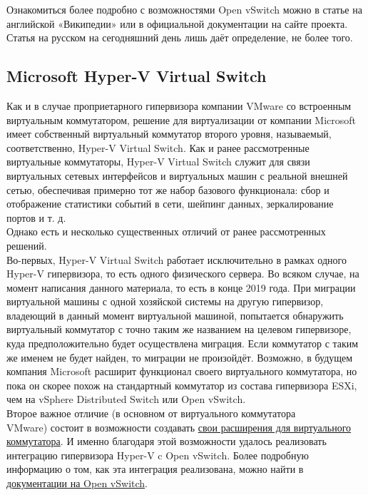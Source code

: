 \documentclass[14pt, a4paper]{article}
\begin{document}
Ознакомиться более подробно с возможностями Open vSwitch можно в статье на английской
«Википедии» или в официальной документации на сайте проекта. Статья на русском на сегодняшний
день лишь даёт определение, не более того.

\subsection*{Microsoft Hyper-V Virtual Switch} 

Как и в случае проприетарного гипервизора компании VMware со встроенным виртуальным
коммутатором, решение для виртуализации от компании Microsoft имеет собственный виртуальный
коммутатор второго уровня, называемый, соответственно, Hyper-V Virtual Switch. Как и ранее
рассмотренные виртуальные коммутаторы, Hyper-V Virtual Switch служит для связи виртуальных
сетевых интерфейсов и виртуальных машин с реальной внешней сетью, обеспечивая примерно тот
же набор базового функционала: сбор и отображение статистики событий в сети, шейпинг данных,
зеркалирование портов и т. д.\\

Однако есть и несколько существенных отличий от ранее рассмотренных решений.\\

Во-первых, Hyper-V Virtual Switch работает исключительно в рамках одного Hyper-V гипервизора, то
есть одного физического сервера. Во всяком случае, на момент написания данного материала, то
есть в конце 2019 года. При миграции виртуальной машины с одной хозяйской системы на другую
гипервизор, владеющий в данный момент виртуальной машиной, попытается обнаружить
виртуальный коммутатор с точно таким же названием на целевом гипервизоре, куда
предположительно будет осуществлена миграция. Если коммутатор с таким же именем не будет
найден, то миграции не произойдёт. Возможно, в будущем компания Microsoft расширит функционал
своего виртуального коммутатора, но пока он скорее похож на стандартный коммутатор из состава
гипервизора ESXi, чем на vSphere Distributed Switch или Open vSwitch.\\

Второе важное отличие (в основном от виртуального коммутатора \\ VMware) состоит в возможности
создавать \href{https://learn.microsoft.com/en-us/windows-hardware/drivers/network/hyper-v-extensible-switch-extensions}{свои расширения для виртуального коммутатора}. И именно благодаря этой возможности
удалось реализовать интеграцию гипервизора Hyper-V c Open vSwitch. Более подробную информацию
о том, как эта интеграция реализована, можно найти в \href{https://docs.openvswitch.org/en/latest/topics/windows/}{документации на Open vSwitch}.\\
\end{document}
